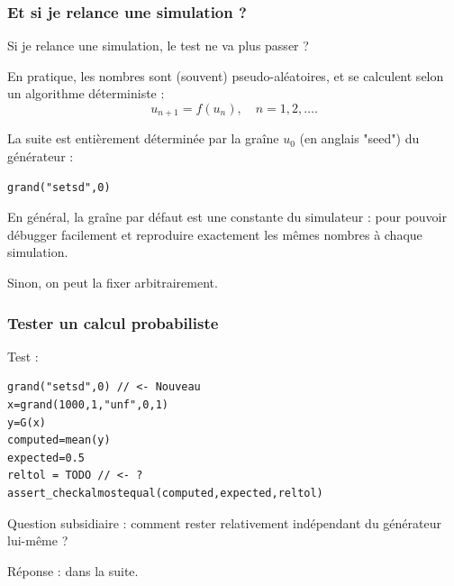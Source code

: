 \documentclass{beamer}
\begin{document}
\begin{frame}[containsverbatim]
\frametitle{Et si je relance une simulation ?}

Si je relance une simulation, le test ne va plus passer ?

En pratique, les nombres sont (souvent) pseudo-aléatoires, et se calculent selon 
un algorithme déterministe :
$$
u_{n+1}=f(u_n), \quad n=1,2,\ldots.
$$

La suite est entièrement déterminée par la graîne $u_0$ (en anglais "seed") 
du générateur :
\begin{lstlisting}
grand("setsd",0)
\end{lstlisting}

En général, la graîne par défaut est une constante du simulateur : 
pour pouvoir débugger facilement et reproduire exactement les 
mêmes nombres à chaque simulation.

Sinon, on peut la fixer arbitrairement. 

\end{frame}

\begin{frame}[containsverbatim]
\frametitle{Tester un calcul probabiliste}

Test :
\begin{lstlisting}
grand("setsd",0) // <- Nouveau
x=grand(1000,1,"unf",0,1)
y=G(x)
computed=mean(y)
expected=0.5
reltol = TODO // <- ?
assert_checkalmostequal(computed,expected,reltol)
\end{lstlisting}

Question subsidiaire : comment rester relativement indépendant du générateur lui-même ?

Réponse : dans la suite.

\end{frame}
\end{document}
